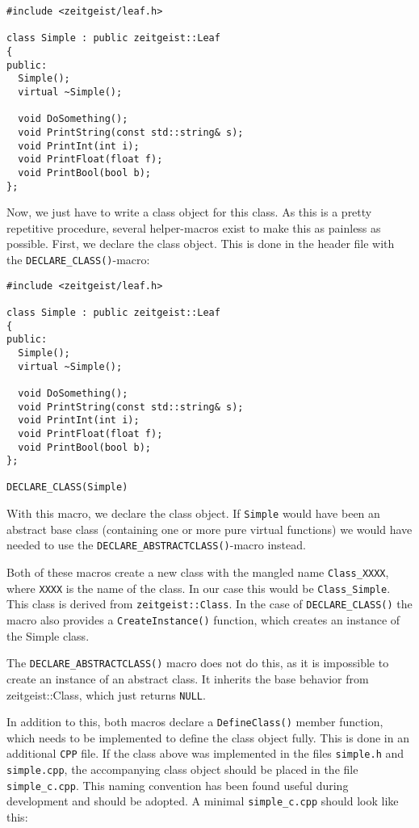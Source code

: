 \begin{verbatim}
#include <zeitgeist/leaf.h>

class Simple : public zeitgeist::Leaf
{
public:
  Simple();
  virtual ~Simple();
  
  void DoSomething();
  void PrintString(const std::string& s);
  void PrintInt(int i);
  void PrintFloat(float f);
  void PrintBool(bool b);
};
\end{verbatim}

Now, we just have to write a class object for this class. As this is a
pretty repetitive procedure, several helper-macros exist to make this
as painless as possible. First, we declare the class object. This is
done in the header file with the \texttt{DECLARE\_CLASS()}-macro:

\begin{verbatim}
#include <zeitgeist/leaf.h>

class Simple : public zeitgeist::Leaf
{
public:
  Simple();
  virtual ~Simple();
  
  void DoSomething();
  void PrintString(const std::string& s);
  void PrintInt(int i);
  void PrintFloat(float f);
  void PrintBool(bool b);
};

DECLARE_CLASS(Simple)
\end{verbatim}

With this macro, we declare the class object. If \texttt{Simple} would
have been an abstract base class (containing one or more pure virtual
functions) we would have needed to use the
\texttt{DECLARE\_ABSTRACTCLASS()}-macro instead. 

Both of these macros create a new class with the mangled name
\texttt{Class\_XXXX}, where \texttt{XXXX} is the name of the class. 
In our case this would be \texttt{Class\_Simple}. This class is derived
from \texttt{zeitgeist::Class}. In the case of
\texttt{DECLARE\_CLASS()} the macro also provides a \texttt{CreateInstance()}
function, which creates an instance of the Simple class. 

The \texttt{DECLARE\_ABSTRACTCLASS()} macro does not do this, as it is
impossible to create an instance of an abstract class. It inherits the
base behavior from zeitgeist::Class, which just returns
\texttt{NULL}. 

In addition to this, both macros declare a \texttt{DefineClass()}
member function, which needs to be implemented to define the class
object fully. This is done in an additional \texttt{CPP} file. If the
class above was implemented in the files \texttt{simple.h} and
\texttt{simple.cpp}, the accompanying class object should be placed in
the file \texttt{simple\_c.cpp}. This naming convention has been found
useful during development and should be adopted. A minimal
\texttt{simple\_c.cpp} should look like this:

